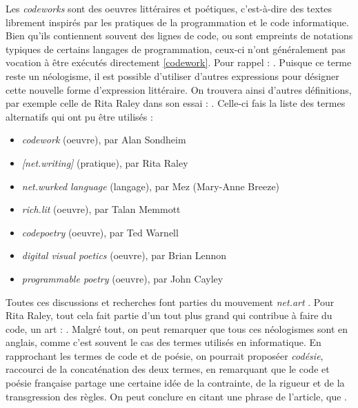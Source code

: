 \documentclass[12pt]{article} %
\begin{document}
Les \textit{codeworks} sont des oeuvres littéraires et poétiques, c'est-à-dire des textes librement inspirés par les pratiques de la programmation et le code informatique. Bien qu'ils contiennent souvent des lignes de code, ou sont empreints de notations typiques de certains langages de programmation, ceux-ci n'ont généralement pas vocation à être exécutés directement \ref{codework}. Pour rappel :  \cite{ELO-ContentByKeyword}. Puisque ce terme reste un néologisme, il est possible d'utiliser d'autres expressions pour désigner cette nouvelle forme d'expression littéraire. On trouvera ainsi d'autres définitions, par exemple celle de Rita Raley dans son essai  :  \cite{RRita-codework}. Celle-ci fais la liste des termes alternatifs qui ont pu être utilisés :
\begin{itemize}
    \item \textit{codework} (oeuvre), par Alan Sondheim
    \item \textit{[net.writing]} (pratique), par Rita Raley
    \item \textit{net.wurked language} (langage), par Mez (Mary-Anne Breeze)
    \item \textit{rich.lit} (oeuvre), par Talan Memmott
    \item \textit{codepoetry} (oeuvre), par Ted Warnell
    \item \textit{digital visual poetics} (oeuvre), par Brian Lennon
    \item \textit{programmable poetry} (oeuvre), par John Cayley
\end{itemize}

Toutes ces discussions et recherches font parties du mouvement \textit{net.art} \cite{RRita-codework} \cite{FCramer2001}. Pour Rita Raley, tout cela fait partie d'un tout plus grand qui contribue à faire du code, un art :  \cite{RRita-codework}. Malgré tout, on peut remarquer que tous ces néologismes sont en anglais, comme c'est souvent le cas des termes utilisés en informatique. En rapprochant les termes de code et de poésie, on pourrait proposéer \textit{codésie}, raccourci de la concaténation des deux termes, en remarquant que le code et poésie française partage une certaine idée de la contrainte, de la rigueur et de la transgression des règles. On peut conclure en citant une phrase de l'article, que   \cite{NouvelObs-codepoesie}.
\end{document}
